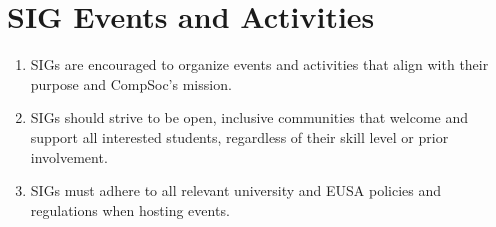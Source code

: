 \section{SIG Events and Activities}
\begin{enumerate}
\item SIGs are encouraged to organize events and activities that align with their purpose and CompSoc's mission.
\item SIGs should strive to be open, inclusive communities that welcome and support all interested students, regardless of their skill level or prior involvement. 
\item SIGs must adhere to all relevant university and EUSA policies and regulations when hosting events.
\end{enumerate}